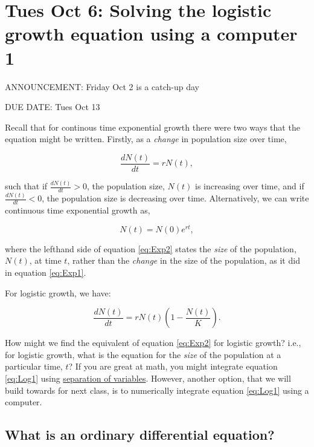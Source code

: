 \documentclass[]{book}
\begin{document}
\chapter{Tues Oct 6: Solving the logistic growth equation using a
computer
1}\label{tues-oct-6-solving-the-logistic-growth-equation-using-a-computer-1}

ANNOUNCEMENT: Friday Oct 2 is a catch-up day

DUE DATE: Tues Oct 13

Recall that for continous time exponential growth there were two ways
that the equation might be written. Firstly, as a \emph{change} in
population size over time,

\begin{equation}
\frac{dN(t)}{dt} = rN(t),
\label{eq:Exp1}
\end{equation}

such that if \(\frac{dN(t)}{dt}>0\), the population size, \(N(t)\) is
increasing over time, and if \(\frac{dN(t)}{dt}<0\), the population size
is decreasing over time. Alternatively, we can write continuous time
exponential growth as,

\begin{equation}
N(t) = N(0)e^{rt},
\label{eq:Exp2}
\end{equation}

where the lefthand side of equation \eqref{eq:Exp2} states the \emph{size}
of the population, \(N(t)\), at time \(t\), rather than the
\emph{change} in the size of the population, as it did in equation
\eqref{eq:Exp1}.

For logistic growth, we have:

\begin{equation}
\frac{dN(t)}{dt} = rN(t)\left(1 - \frac{N(t)}{K} \right).
\label{eq:Log1}
\end{equation}

How might we find the equivalent of equation \eqref{eq:Exp2} for logistic
growth? i.e., for logistic growth, what is the equation for the
\emph{size} of the population at a particular time, \(t\)? If you are
great at math, you might integrate equation \eqref{eq:Log1} using
\href{https://math.usu.edu/~powell/ysa-html/node8.html}{separation of
variables}. However, another option, that we will build towards for next
class, is to numerically integrate equation \eqref{eq:Log1} using a
computer.

\section{What is an ordinary differential
equation?}\label{what-is-an-ordinary-differential-equation}
\end{document}
